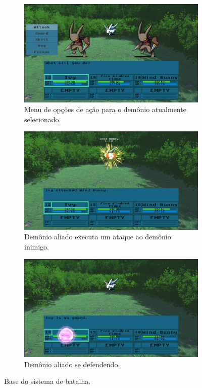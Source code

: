 \begin{figure}[h!]
  \centering
  \begin{subfigure}[b]{0.5\linewidth}
    \includegraphics[width=\linewidth]{options.jpg}
     \caption{Menu de opções de ação para o demônio atualmente selecionado.}
  \end{subfigure}
  \begin{subfigure}[b]{0.5\linewidth}
    \includegraphics[width=\linewidth]{attack.jpg}
    \caption{Demônio aliado executa um ataque ao demônio inimigo.}
  \end{subfigure}
  \begin{subfigure}[b]{0.5\linewidth}
    \includegraphics[width=\linewidth]{guard.jpg}
    \caption{Demônio aliado se defendendo.}
  \end{subfigure}
  \caption{Base do sistema de batalha.}
  \label{fig:battle}
\end{figure}

